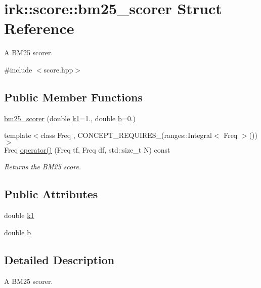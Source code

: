 \hypertarget{structirk_1_1score_1_1bm25__scorer}{}\section{irk\+:\+:score\+:\+:bm25\+\_\+scorer Struct Reference}
\label{structirk_1_1score_1_1bm25__scorer}


A B\+M25 scorer.  




{\ttfamily \#include $<$score.\+hpp$>$}

\subsection*{Public Member Functions}
\begin{DoxyCompactItemize}
\item 
\mbox{\hyperlink{structirk_1_1score_1_1bm25__scorer_a8ba7a12182356ea58d5d1b5f279cf58a}{bm25\+\_\+scorer}} (double \mbox{\hyperlink{structirk_1_1score_1_1bm25__scorer_ad39731decbddbe8d09c3094e75938f4e}{k1}}=1., double \mbox{\hyperlink{structirk_1_1score_1_1bm25__scorer_adbc316be2c46daf96501ec1f79c96e73}{b}}=0.)
\item 
{\footnotesize template$<$class Freq , C\+O\+N\+C\+E\+P\+T\+\_\+\+R\+E\+Q\+U\+I\+R\+E\+S\+\_\+(ranges\+::\+Integral$<$ Freq $>$()) $>$ }\\Freq \mbox{\hyperlink{structirk_1_1score_1_1bm25__scorer_aa82755eac7a52ec53f578cff81170422}{operator()}} (Freq tf, Freq df, std\+::size\+\_\+t N) const
\begin{DoxyCompactList}\small\item\em Returns the B\+M25 score. \end{DoxyCompactList}\end{DoxyCompactItemize}
\subsection*{Public Attributes}
\begin{DoxyCompactItemize}
\item 
double \mbox{\hyperlink{structirk_1_1score_1_1bm25__scorer_ad39731decbddbe8d09c3094e75938f4e}{k1}}
\item 
double \mbox{\hyperlink{structirk_1_1score_1_1bm25__scorer_adbc316be2c46daf96501ec1f79c96e73}{b}}
\end{DoxyCompactItemize}


\subsection{Detailed Description}
A B\+M25 scorer. 

